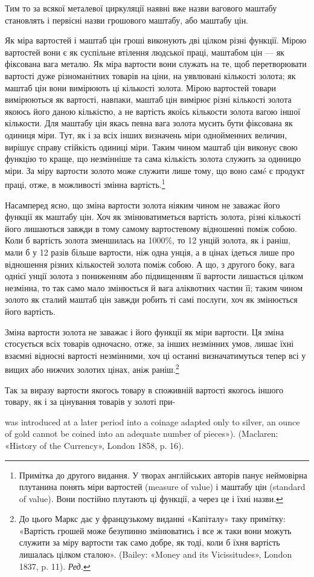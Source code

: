 Тим то за всякої металевої циркуляції наявні вже назви вагового
маштабу становлять і первісні назви грошового маштабу,
або маштабу цін.

Як міра вартостей і маштаб цін гроші виконують дві цілком
різні функції. Мірою вартостей вони є як суспільне втілення
людської праці, маштабом цін — як фіксована вага металю.
Як міра вартости вони служать на те, щоб перетворювати вартості
дуже різноманітних товарів на ціни, на уявлювані кількості
золота; як маштаб цін вони вимірюють ці кількості золота. Мірою
вартостей товари вимірюються як вартості, навпаки, маштаб
цін вимірює різні кількості золота якоюсь його даною кількістю,
а не вартість якоїсь кількости золота вагою іншої кількости.
Для маштабу цін якась певна вага золота мусить бути фіксована
як одиниця міри. Тут, як і за всіх інших визначень міри однойменних
величин, вирішує справу стійкість одиниці міри. Таким
чином маштаб цін виконує свою функцію то краще, що незмінніше
та сама кількість золота служить за одиницю міри. За міру
вартости золото може служити лише тому, що воно самé є продукт
праці, отже, в можливості змінна вартість.\footnote{
Примітка до другого видання. У творах англійських авторів
панує неймовірна плутанина понять міри вартостей (measure of value)
і маштабу цін (standard of value). Вони постійно плутають ці функції,
а через це і їхні назви.
}

Насамперед ясно, що зміна вартости золота ніяким чином не
заважає його функції як маштабу цін. Хоч як змінюватиметься
вартість золота, різні кількості його лишаються завжди в тому
самому вартостевому відношенні поміж собою. Коли б вартість
золота зменшилась на 1000\%, то 12 унцій золота, як і раніш, мали б
у 12 разів більше вартости, ніж одна унція, а в цінах ідеться
лише про відношення різних кількостей золота поміж собою.
А що, з другого боку, вага однієї унції золота з пониженням
або підвищенням її вартости лишається цілком незмінна, то так
само мало змінюється й вага аліквотних частин її; таким чином
золото як сталий маштаб цін завжди робить ті самі послуги, хоч
як змінюється його вартість.

Зміна вартости золота не заважає і його функції як міри вартости.
Ця зміна стосується всіх товарів одночасно, отже, за інших
незмінних умов, лишає їхні взаємні відносні вартості незмінними,
хоч ці останні визначатимуться тепер всі у вищих або
нижчих золотих цінах, аніж раніш.\footnote*{
До цього Маркс дає у французькому виданні «Капіталу» таку примітку:
«Вартість грошей може безупинно змінюватись і все ж таки вони
можуть служити за міру вартости так само добре, як тоді, коли б їхня
вартість лишалась цілком сталою». (Bailey: «Money and its Vicissitudes»,
London 1837, p. 11). \emph{Ред.}
}

Так за виразу вартости якогось товару в споживній вартості
якогось іншого товару, як і за цінування товарів у золоті при-

was introduced at a later period into a coinage adapted only to silver, an
ounce of gold cannot be coined into an adequate number of pieces»). (Maclaren:
«History of the Currency», London 1858, p. 16).